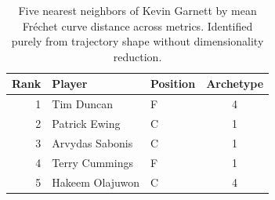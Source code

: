 \begin{table}[htbp]
  \centering\small
  \begin{tabular}{rllc}
    \toprule
    Rank & Player & Position & Archetype \\
    \midrule
    1 & Tim Duncan & F & 4 \\
    2 & Patrick Ewing & C & 1 \\
    3 & Arvydas Sabonis & C & 1 \\
    4 & Terry Cummings & F & 1 \\
    5 & Hakeem Olajuwon & C & 4 \\
    \bottomrule
  \end{tabular}
  \caption{Five nearest neighbors of Kevin Garnett by mean Fr\'{e}chet curve distance across metrics. Identified purely from trajectory shape without dimensionality reduction.}
  \label{tab:Kevin_Garnett_frechet_curve_neighbors}
\end{table}

